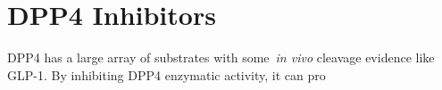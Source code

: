 \section{DPP4 Inhibitors}
DPP4 has a large array of substrates with some~\textit{in vivo} cleavage evidence like GLP-1. By inhibiting DPP4 enzymatic activity, it can pro